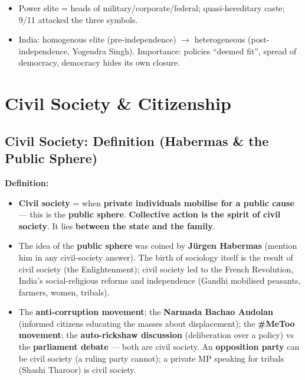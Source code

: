 \begin{QuickRevision}
\begin{itemize}
\item Power elite = heads of military/corporate/federal; quasi-hereditary caste; 9/11 attacked the three symbols.
\item India: homogenous elite (pre-independence) $\rightarrow$ heterogeneous (post-independence, Yogendra Singh). Importance: policies ``deemed fit'', spread of democracy, democracy hides its own closure.
\end{itemize}
\end{QuickRevision}

\sectiondivider

\section{Civil Society \& Citizenship}

\subsection{Civil Society: Definition (Habermas \& the Public Sphere)}

\begin{KeyConcept}
\textbf{Definition:}
\begin{itemize}
\item \textbf{Civil society} = when \textbf{private individuals mobilise for a public cause} --- this is the \textbf{public sphere}. \textbf{Collective action is the spirit of civil society}. It lies \textbf{between the state and the family}.
\item The idea of the \textbf{public sphere} was coined by \textbf{J\"urgen Habermas} (mention him in any civil-society answer). The birth of sociology itself is the result of civil society (the Enlightenment); civil society led to the French Revolution, India's social-religious reforms and independence (Gandhi mobilised peasants, farmers, women, tribals).
\end{itemize}
\end{KeyConcept}

\begin{ExampleBox}
\begin{itemize}
\item The \textbf{anti-corruption movement}; the \textbf{Narmada Bachao Andolan} (informed citizens educating the masses about displacement); the \textbf{\#MeToo movement}; the \textbf{auto-rickshaw discussion} (deliberation over a policy) vs the \textbf{parliament debate} --- both are civil society. An \textbf{opposition party} can be civil society (a ruling party cannot); a private MP speaking for tribals (Shashi Tharoor) is civil society.
\end{itemize}
\end{ExampleBox}

